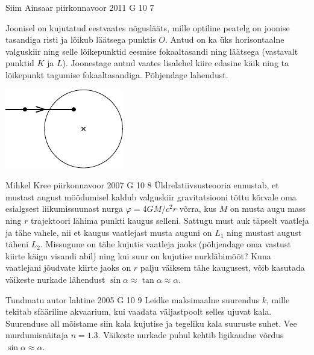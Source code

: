 \documentclass[11pt]{article}
\begin{document}
{%
{Siim Ainsaar} %
{piirkonnavoor} %
{2011} %
{G 10} %
{7} %
{
\ifStatement
Joonisel on kujutatud eestvaates nõguslääts, mille optiline peatelg on joonise tasandiga risti ja lõikub läätsega punktis $O$. Antud on ka üks horisontaalne valguskiir ning selle lõikepunktid eesmise fokaaltasandi ning läätsega (vastavalt punktid $K$ ja $L$). Joonestage antud vaates lisalehel kiire edasine käik ning ta lõikepunkt tagumise fokaaltasandiga. Põhjendage lahendust.
\begin{center}
	\includegraphics[width=0.5\linewidth]{2011-v2g-10-yl}
\end{center}
\fi
}

{Mihkel Kree} %
{piirkonnavoor} %
{2007} %
{G 10} %
{8} %
{
\ifStatement
Üldrelatiivsusteooria ennustab, et mustast august möödumisel kaldub valguskiir gravitatsiooni tõttu kõrvale oma esialgsest liikumissuunast nurga $\varphi = 4GM/c^2r$ võrra, kus $M$ on musta augu mass ning $r$ trajektoori lähima punkti kaugus selleni. Sattugu must auk täpselt vaatleja ja tähe vahele, nii et kaugus vaatlejast musta auguni on $L_1$ ning mustast august täheni $L_2$. Missugune on tähe kujutis vaatleja jaoks (põhjendage oma vastust kiirte käigu visandi abil) ning kui suur on kujutise nurkläbimõõt? Kuna vaatlejani jõudvate kiirte jaoks on $r$ palju väiksem tähe kaugusest, võib kasutada väikeste nurkade lähendust $\sin \alpha \approx \tan \alpha \approx \alpha$.
\fi
}

{Tundmatu autor} %
{lahtine} %
{2005} %
{G 10} %
{9} %
{
\ifStatement
Leidke maksimaalne suurendus $k$, mille tekitab sfääriline akvaarium, kui vaadata väljastpoolt selles ujuvat kala. Suurenduse all mõistame siin kala kujutise ja tegeliku kala suuruste suhet. Vee murdumisnäitaja $n = \num{1,3}$. Väikeste nurkade puhul kehtib ligikaudne võrdus $\sin \alpha \approx \alpha$. 
\fi
}

}
\end{document}
